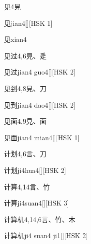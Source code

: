 \begin{entry}{见}{4}{⾒}
  \begin{phonetics}{见}{jian4}[][HSK 1]
  \end{phonetics}
  \begin{phonetics}{见}{xian4}
  \end{phonetics}
\end{entry}

\begin{entry}{见过}{4,6}{⾒、⾡}
  \begin{phonetics}{见过}{jian4 guo4}[][HSK 2]
  \end{phonetics}
\end{entry}

\begin{entry}{见到}{4,8}{⾒、⼑}
  \begin{phonetics}{见到}{jian4 dao4}[][HSK 2]
  \end{phonetics}
\end{entry}

\begin{entry}{见面}{4,9}{⾒、⾯}
  \begin{phonetics}{见面}{jian4 mian4}[][HSK 1]
  \end{phonetics}
\end{entry}

\begin{entry}{计划}{4,6}{⾔、⼑}
  \begin{phonetics}{计划}{ji4hua4}[][HSK 2]
  \end{phonetics}
\end{entry}

\begin{entry}{计算}{4,14}{⾔、⽵}
  \begin{phonetics}{计算}{ji4suan4}[][HSK 3]
  \end{phonetics}
\end{entry}

\begin{entry}{计算机}{4,14,6}{⾔、⽵、⽊}
  \begin{phonetics}{计算机}{ji4 suan4 ji1}[][HSK 2]
  \end{phonetics}
\end{entry}

